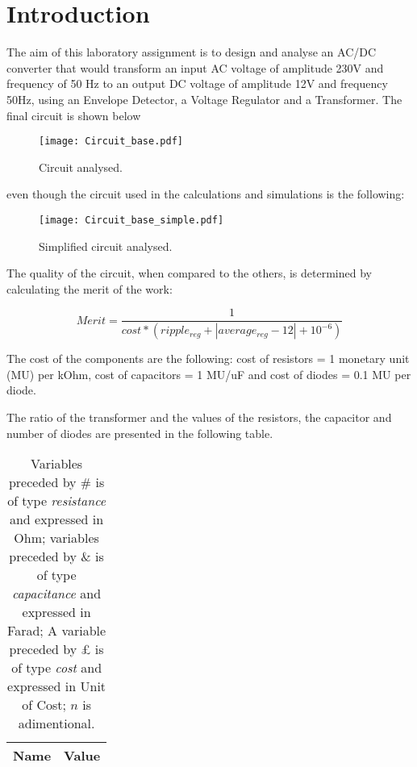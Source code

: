 \section{Introduction}
\label{sec:introduction}

The aim of this laboratory assignment is to design and analyse an AC/DC converter that would transform an input AC voltage of amplitude 230V and frequency of 50 Hz to an output DC voltage of amplitude 12V and frequency 50Hz, using an Envelope Detector, a Voltage Regulator and a Transformer. The final circuit is shown below

\begin{figure}[h] \centering
\texttt{[image: Circuit\_base.pdf]}
\caption{Circuit analysed.}
\label{fig:Circuit_Base}
\end{figure}

even though the circuit used in the calculations and simulations is the following:

\begin{figure}[h] \centering
\texttt{[image: Circuit\_base\_simple.pdf]}
\caption{Simplified circuit analysed.}
\label{fig:Circuit_Base_S}
\end{figure}

The quality of the circuit, when compared to the others, is determined by calculating the merit of the work: 

\begin{equation}
	Merit = \frac{1}{cost*(ripple_{reg}+|average_{reg}-12|+10^{-6})}
\label{eq:i1}
\end{equation}

The cost of the components are the following: cost of resistors = 1 monetary unit (MU) per kOhm, cost of capacitors = 1 MU/uF and cost of diodes = 0.1 MU per diode.

\newpage

The ratio of the transformer and the values of the resistors, the capacitor and number of diodes are presented in the following table.

\begin{table}[h]
  \centering
  \begin{tabular}{|l|r|}
    \hline    
    {\bf Name} & {\bf Value} \\ \hline
    
  \end{tabular}
  \caption{Variables preceded by \# is of type {\em resistance} and expressed in Ohm; variables preceded by \& is of type {\em capacitance} and expressed in Farad; A variable preceded by £ is of type {\it cost} and expressed in Unit of Cost; $n$ is adimentional.}
  \label{tab:INTRO_VALUES}
\end{table}

